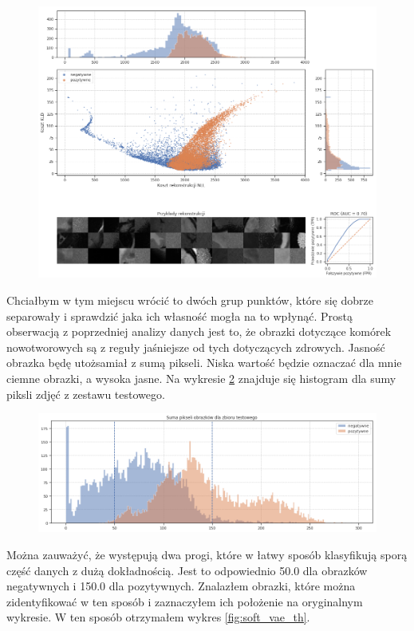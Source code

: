 \begin{figure}[h!]
    \centering
    \includegraphics[width=1.0\textwidth]{images/soft_vae_v2}
    \caption{}
    \label{fig:soft_vae}
\end{figure}

Chciałbym w tym miejscu wrócić to dwóch grup punktów, które się dobrze separowały i sprawdzić jaka ich własność mogła na to wpłynąć. Prostą obserwacją z poprzedniej analizy danych jest to, że obrazki dotyczące komórek nowotworowych są z reguły jaśniejsze od tych dotyczących zdrowych. Jasność obrazka będę utożsamiał z sumą pikseli. Niska wartość będzie oznaczać dla mnie ciemne obrazki, a wysoka jasne. Na wykresie \ref{fig:pixels_hist} znajduje się histogram dla sumy piksli zdjęć z zestawu testowego.

\begin{figure}[h!]
    \centering
    \includegraphics[width=1.0\textwidth]{images/pixels_hist_v2}
    \caption{}
    \label{fig:pixels_hist}
\end{figure}

Można zauważyć, że występują dwa progi, które w łatwy sposób klasyfikują sporą część danych z dużą dokładnością. Jest to odpowiednio 50.0 dla obrazków negatywnych i 150.0 dla pozytywnych. Znalazłem obrazki, które można zidentyfikować w ten sposób i zaznaczyłem ich położenie na oryginalnym wykresie. W ten sposób otrzymałem wykres \ref{fig:soft_vae_th}.

